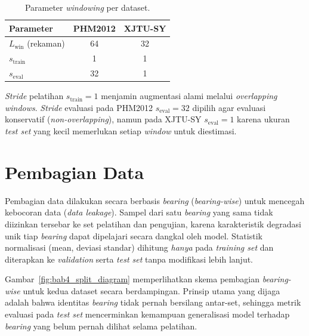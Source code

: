 \begin{table}[ht]
\centering
\caption{Parameter \emph{windowing} per dataset.}
\label{tab:bab4_window}
\small
\begin{tabular}{@{}lSS@{}}
\toprule
\textbf{Parameter} & \textbf{PHM2012} & \textbf{XJTU-SY} \\
\midrule
$L_{\text{win}}$ (rekaman)  & 64    & 32    \\
$s_{\text{train}}$          & 1     & 1     \\
$s_{\text{eval}}$           & 32    & 1     \\
\bottomrule
\end{tabular}
\end{table}

\emph{Stride} pelatihan $s_{\text{train}} = 1$ menjamin augmentasi
alami melalui \emph{overlapping windows}.
\emph{Stride} evaluasi pada PHM2012 $s_{\text{eval}} = 32$ dipilih agar
evaluasi konservatif (\emph{non-overlapping}), namun pada XJTU-SY
$s_{\text{eval}} = 1$ karena ukuran \emph{test set} yang kecil
memerlukan setiap \emph{window} untuk diestimasi.

\section{Pembagian Data}
\label{sec:bab4_split}

Pembagian data dilakukan secara berbasis \emph{bearing} (\emph{bearing-wise})
untuk mencegah kebocoran data (\emph{data leakage}).
Sampel dari satu \emph{bearing} yang sama tidak diizinkan tersebar ke set
pelatihan dan pengujian, karena karakteristik degradasi unik tiap
\emph{bearing} dapat dipelajari secara dangkal oleh model.
Statistik normalisasi (mean, deviasi standar) dihitung \emph{hanya}
pada \emph{training set} dan diterapkan ke \emph{validation} serta
\emph{test set} tanpa modifikasi lebih lanjut.

Gambar~\ref{fig:bab4_split_diagram} memperlihatkan skema pembagian
\emph{bearing-wise} untuk kedua dataset secara berdampingan. Prinsip
utama yang dijaga adalah bahwa identitas \emph{bearing} tidak pernah
bersilang antar-set, sehingga metrik evaluasi pada \emph{test set}
mencerminkan kemampuan generalisasi model terhadap \emph{bearing} yang
belum pernah dilihat selama pelatihan.

